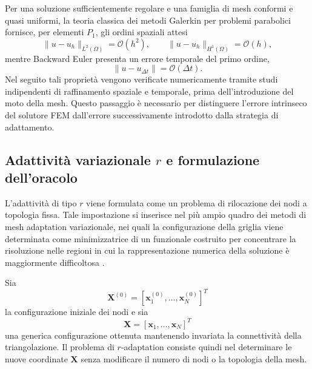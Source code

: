 Per una soluzione sufficientemente regolare e una famiglia di mesh conformi e quasi uniformi, la teoria classica dei metodi Galerkin per problemi parabolici fornisce, per elementi $P_1$, gli ordini spaziali attesi
\begin{equation}
\|u-u_h\|_{L^2(\Omega)}
=
\mathcal{O}(h^2),
\qquad
\|u-u_h\|_{H^1(\Omega)}
=
\mathcal{O}(h),
\label{eq:spatial_convergence}
\end{equation}
mentre Backward Euler presenta un errore temporale del primo ordine,
\begin{equation}
\|u-u_{\Delta t}\|
=
\mathcal{O}(\Delta t).
\label{eq:temporal_convergence}
\end{equation}
Nel seguito tali proprietà vengono verificate numericamente tramite studi indipendenti di raffinamento spaziale e temporale, prima dell'introduzione del moto della mesh. Questo passaggio è necessario per distinguere l'errore intrinseco del solutore FEM dall'errore successivamente introdotto dalla strategia di adattamento.

\subsection{\texorpdfstring{Adattività variazionale $r$ e formulazione dell'oracolo}{Adattività variazionale r e formulazione dell'oracolo}}

\label{subsec:oracle_formulation}

L'adattività di tipo $r$ viene formulata come un problema di rilocazione dei nodi a topologia fissa. Tale impostazione si inserisce nel più ampio quadro dei metodi di mesh adaptation variazionale, nei quali la configurazione della griglia viene determinata come minimizzatrice di un funzionale costruito per concentrare la risoluzione nelle regioni in cui la rappresentazione numerica della soluzione è maggiormente difficoltosa \citep{huang2001variational,huang2003variational,cao2001comparison,budd2009adaptivity}.

Sia
\[
\mathbf{X}^{(0)}
=
\left[
\mathbf{x}_1^{(0)},\ldots,\mathbf{x}_N^{(0)}
\right]^T
\]
la configurazione iniziale dei nodi e sia
\[
\mathbf{X}
=
\left[
\mathbf{x}_1,\ldots,\mathbf{x}_N
\right]^T
\]
una generica configurazione ottenuta mantenendo invariata la connettività della triangolazione. Il problema di $r$-adaptation consiste quindi nel determinare le nuove coordinate $\mathbf{X}$ senza modificare il numero di nodi o la topologia della mesh.


